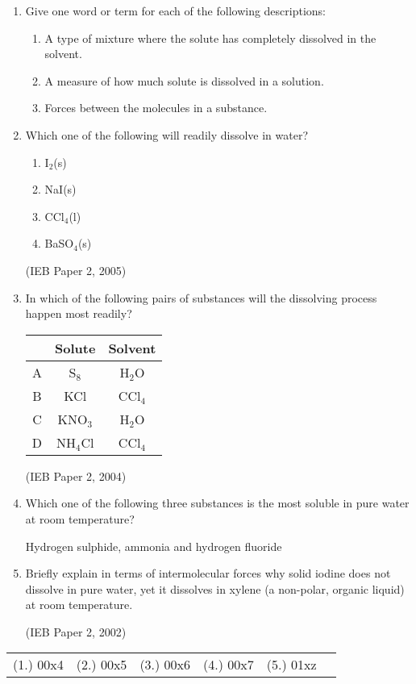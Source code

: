 \begin{eocexercises}{}

\begin{enumerate}
\item{Give one word or term for each of the following descriptions:}
\begin{enumerate}
\item{A type of mixture where the solute has completely dissolved in the solvent.}
\item{A measure of how much solute is dissolved in a solution.}
\item{Forces between the molecules in a substance.}
\end{enumerate}

\item{Which one of the following will readily dissolve in water?}
\begin{enumerate}
\item{I$_{2}$(s)}
\item{NaI(s)}
\item{CCl$_{4}$(l)}
\item{BaSO$_{4}$(s)}
\end{enumerate}

(IEB Paper 2, 2005)

\item{In which of the following pairs of substances will the dissolving process happen most readily?}

\begin{tabular}{|c|c|c|}\hline
& \textbf{Solute} & \textbf{Solvent} \\\hline
A & S$_{8}$ & H$_{2}$O \\\hline
B & KCl & CCl$_{4}$ \\\hline
C & KNO$_{3}$ & H$_{2}$O \\\hline
D & NH$_{4}$Cl & CCl$_{4}$ \\\hline
\end{tabular}

(IEB Paper 2, 2004)


\item{Which one of the following three substances is the most soluble in pure water at room temperature?}
\begin{center}
Hydrogen sulphide, ammonia and hydrogen fluoride
\end{center}

\item{Briefly explain in terms of intermolecular forces why solid iodine does not dissolve in pure water, yet it dissolves in xylene (a non-polar, organic liquid) at room temperature.}

(IEB Paper 2, 2002)

\end{enumerate}

\practiceinfo

\begin{tabular}[h]{cccccc}
(1.) 00x4 & (2.) 00x5 & (3.) 00x6 & (4.) 00x7 & (5.) 01xz
 \end{tabular}
\end{eocexercises}








